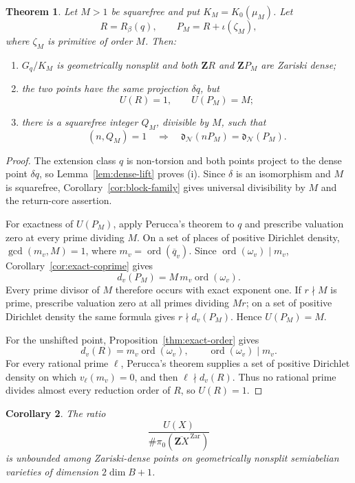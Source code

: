 \documentclass[11pt,letterpaper,reqno]{amsart}
\newtheorem{theorem}{Theorem}[section]
\newtheorem{corollary}[theorem]{Corollary}
\theoremstyle{definition}
\theoremstyle{remark}
\newcommand{\ord}{\operatorname{ord}}
\newcommand{\dd}{\mathfrak d}
\newcommand{\Zar}{\mathrm{Zar}}
\newcommand{\Ner}{\mathcal N}
\begin{document}
\begin{theorem}
\label{thm:squarefree-M}
Let $M>1$ be squarefree and put $K_M=K_0(\mu_M)$.  Let
\[
 R=R_\beta(q),
 \qquad
 P_M=R+\iota(\zeta_M),
\]
where $\zeta_M$ is primitive of order $M$.  Then:
\begin{enumerate}[label=\textup{(\roman*)}]
\item $G_q/K_M$ is geometrically nonsplit and both $\mathbf ZR$ and
      $\mathbf ZP_M$ are Zariski dense;
\item the two points have the same projection $\delta q$, but
\begin{equation}\label{eq:torsion-sensitivity}
 U(R)=1,
 \qquad
 U(P_M)=M;
\end{equation}
\item there is a squarefree integer $Q_M$, divisible by $M$, such that
\[
 (n,Q_M)=1
 \quad\Longrightarrow\quad
 \dd_{\Ner}(nP_M)=\dd_{\Ner}(P_M).
\]
\end{enumerate}
\end{theorem}

\begin{proof}
The extension class $q$ is non-torsion and both points project to the dense
point $\delta q$, so Lemma~\ref{lem:dense-lift} proves (i).  Since $\delta$ is an
isomorphism and $M$ is squarefree, Corollary~\ref{cor:block-family} gives universal
divisibility by $M$ and the return-core assertion.

For exactness of $U(P_M)$, apply Perucca's theorem to $q$ and prescribe
valuation zero at every prime dividing $M$.  On a set of places of positive
Dirichlet density, $\gcd(m_v,M)=1$, where
$m_v=\ord(\overline q_v)$.  Since $\ord(\omega_v)\mid m_v$,
Corollary~\ref{cor:exact-coprime} gives
\[
 d_v(P_M)=M\,m_v\ord(\omega_v).
\]
Every prime divisor of $M$ therefore occurs with exact exponent one.  If
$r\nmid M$ is prime, prescribe valuation zero at all primes dividing $Mr$;
on a set of positive Dirichlet density the same formula gives $r\nmid d_v(P_M)$.  Hence
$U(P_M)=M$.

For the unshifted point, Proposition~\ref{thm:exact-order} gives
\[
 d_v(R)=m_v\ord(\omega_v),
 \qquad \ord(\omega_v)\mid m_v.
\]
For every rational prime $\ell$, Perucca's theorem supplies a set of positive Dirichlet density on which
$v_\ell(m_v)=0$, and then $\ell\nmid d_v(R)$.  Thus no rational prime
divides almost every reduction order of $R$, so $U(R)=1$.
\end{proof}

\begin{corollary}
\label{cor:arbitrary-discrepancy}
The ratio
\[
 \frac{U(X)}{\#\pi_0(\overline{\mathbf ZX}^{\,\Zar})}
\]
is unbounded among Zariski-dense points on geometrically nonsplit semiabelian varieties of dimension $2\dim B+1$. 
\end{corollary}
\end{document}
